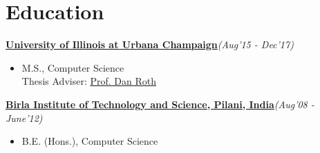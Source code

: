 \vspace{-0.2cm}
\section{\mysidestyle Education}
\vspace{0mm}
\textbf{\href{https://cs.illinois.edu/}{University of Illinois at Urbana Champaign}}\hfill {\small\textit{(Aug'15 - Dec'17)}}
\begin{itemize}[leftmargin=*]\compresslist
    \item[]M.S., Computer Science 
    \\
Thesis Adviser: \href{http://www.cis.upenn.edu/~danroth/}{Prof. Dan Roth}
\end{itemize}
\vspace{-0.2cm}
\textbf{\href{http://www.bits-pilani.ac.in/}{Birla Institute of Technology and Science, Pilani, India}}\hfill{\small\textit{(Aug'08 - June'12)}}
\begin{itemize}[leftmargin=*]\compresslist
    \item[]B.E. (Hons.), Computer Science %
\end{itemize}